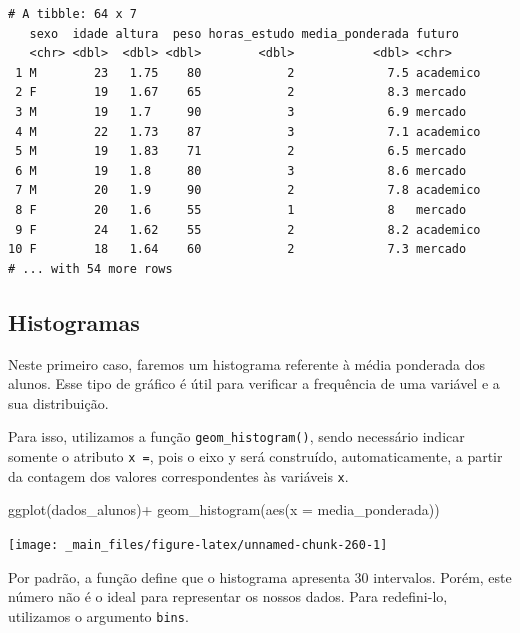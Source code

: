 \documentclass[
  brazilian,
]{book}
\newenvironment{Shaded}{\begin{snugshade}}{\end{snugshade}}
\newcommand{\AttributeTok}[1]{\textcolor[rgb]{0.77,0.63,0.00}{#1}}
\newcommand{\FunctionTok}[1]{\textcolor[rgb]{0.00,0.00,0.00}{#1}}
\newcommand{\NormalTok}[1]{#1}
\newcommand{\SpecialCharTok}[1]{\textcolor[rgb]{0.00,0.00,0.00}{#1}}
\begin{document}
\begin{verbatim}
# A tibble: 64 x 7
   sexo  idade altura  peso horas_estudo media_ponderada futuro   
   <chr> <dbl>  <dbl> <dbl>        <dbl>           <dbl> <chr>    
 1 M        23   1.75    80            2             7.5 academico
 2 F        19   1.67    65            2             8.3 mercado  
 3 M        19   1.7     90            3             6.9 mercado  
 4 M        22   1.73    87            3             7.1 academico
 5 M        19   1.83    71            2             6.5 mercado  
 6 M        19   1.8     80            3             8.6 mercado  
 7 M        20   1.9     90            2             7.8 academico
 8 F        20   1.6     55            1             8   mercado  
 9 F        24   1.62    55            2             8.2 academico
10 F        18   1.64    60            2             7.3 mercado  
# ... with 54 more rows
\end{verbatim}

\hypertarget{histogramas}{%
\subsection{Histogramas}\label{histogramas}}

Neste primeiro caso, faremos um histograma referente à média ponderada dos alunos. Esse tipo de gráfico é útil para verificar a frequência de uma variável e a sua distribuição.

Para isso, utilizamos a função \texttt{geom\_histogram()}, sendo necessário indicar somente o atributo \texttt{x\ =}, pois o eixo y será construído, automaticamente, a partir da contagem dos valores correspondentes às variáveis \texttt{x}.

\begin{Shaded}
\begin{Highlighting}[]
\FunctionTok{ggplot}\NormalTok{(dados\_alunos)}\SpecialCharTok{+}
  \FunctionTok{geom\_histogram}\NormalTok{(}\FunctionTok{aes}\NormalTok{(}\AttributeTok{x =}\NormalTok{ media\_ponderada))}
\end{Highlighting}
\end{Shaded}

\begin{center}\texttt{[image: \_main\_files/figure-latex/unnamed-chunk-260-1]} \end{center}

Por padrão, a função define que o histograma apresenta 30 intervalos. Porém, este número não é o ideal para representar os nossos dados. Para redefini-lo, utilizamos o argumento \texttt{bins}.
\end{document}
